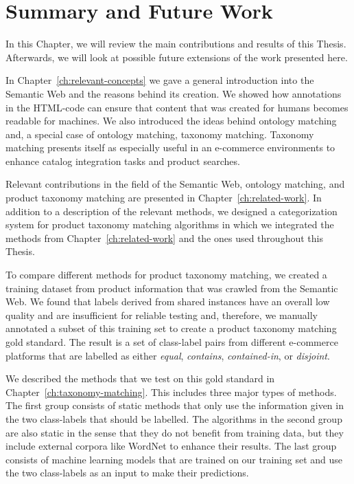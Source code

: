 \chapter{Summary and Future Work}
\label{ch:summary}

In this Chapter, we will review the main contributions and results of this Thesis.
Afterwards, we will look at possible future extensions of the work presented here.

In Chapter~\ref{ch:relevant-concepts} we gave a general introduction into the Semantic Web and the reasons behind
its creation.
We showed how annotations in the HTML-code can ensure that content that was created for humans becomes
readable for machines.
We also introduced the ideas behind ontology matching and, a special case of ontology matching, taxonomy matching.
Taxonomy matching presents itself as especially useful in an e-commerce environments to enhance catalog integration
tasks and product searches.

Relevant contributions in the field of the Semantic Web, ontology matching, and product taxonomy matching are presented
in Chapter~\ref{ch:related-work}.
In  addition to  a description of the relevant methods, we designed a categorization system for product taxonomy matching
algorithms in which we integrated the methods from Chapter~\ref{ch:related-work} and the ones used throughout this Thesis.

To compare different methods for product taxonomy matching, we created a training dataset from product information
that was crawled from the Semantic Web.
We found that labels derived from shared instances have an overall low quality and are insufficient for reliable
testing and, therefore, we manually annotated a subset of this training set to create a product
taxonomy matching gold standard.
The  result is a  set of class-label pairs from different e-commerce platforms that are labelled as either \emph{equal}, \emph{contains},
\emph{contained-in}, or \emph{disjoint}.

We described the methods that we test on this gold standard in Chapter~\ref{ch:taxonomy-matching}.
This includes three major types of methods.
The first group consists of static methods that only use the information given in the two class-labels that should be
labelled.
The algorithms in the second group are also static in the sense that they do not benefit from training data, but they include
external corpora like WordNet to enhance their results.
The last group consists of machine learning models that are trained on our training set and use the two class-labels
as an input to make their predictions.

